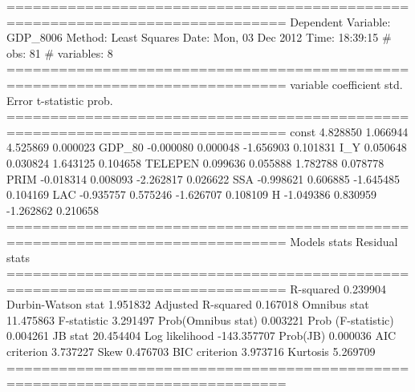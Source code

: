 ==============================================================================
Dependent Variable: GDP_8006
Method: Least Squares
Date:  Mon, 03 Dec 2012
Time:  18:39:15
# obs:                  81
# variables:         8
==============================================================================
variable     coefficient     std. Error      t-statistic     prob.
==============================================================================
const           4.828850      1.066944      4.525869      0.000023
GDP_80          -0.000080      0.000048     -1.656903      0.101831
I_Y             0.050648      0.030824      1.643125      0.104658
TELEPEN           0.099636      0.055888      1.782788      0.078778
PRIM           -0.018314      0.008093     -2.262817      0.026622
SSA            -0.998621      0.606885     -1.645485      0.104169
LAC            -0.935757      0.575246     -1.626707      0.108109
H              -1.049386      0.830959     -1.262862      0.210658
==============================================================================
Models stats                         Residual stats
==============================================================================
R-squared             0.239904         Durbin-Watson stat   1.951832
Adjusted R-squared    0.167018         Omnibus stat         11.475863
F-statistic           3.291497         Prob(Omnibus stat)   0.003221
Prob (F-statistic)    0.004261			JB stat              20.454404
Log likelihood       -143.357707			Prob(JB)             0.000036
AIC criterion         3.737227         Skew                 0.476703
BIC criterion         3.973716         Kurtosis             5.269709
==============================================================================
